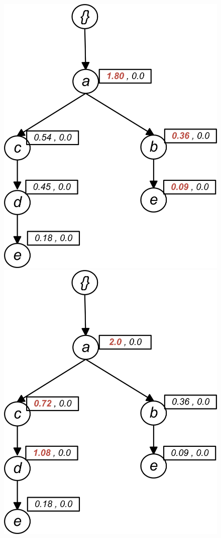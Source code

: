 \begin{figure}
\begin{minipage}{0.40\textwidth}
  \centering
  \includegraphics[width=\textwidth]{images/sim_02.jpg}
\end{minipage}
\hfill
\begin{minipage}{0.40\textwidth}
  \centering
  \includegraphics[width=\textwidth]{images/sim_03.jpg}

\end{minipage}
\end{figure}
